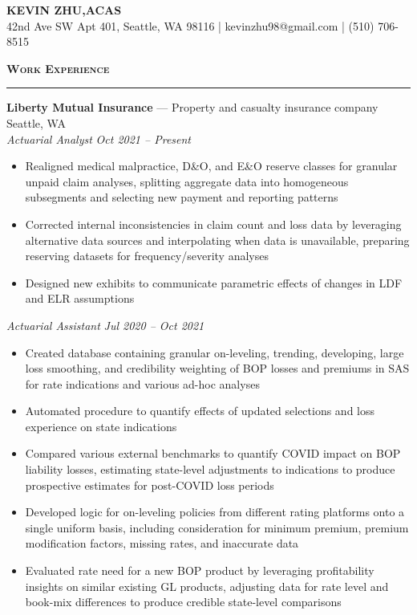 \documentclass[11pt,letterpaper]{article}
\newcommand{\sectline}{\vspace{5pt}\hrule height 1.5pt\vspace{5pt}}
\newcommand{\sectspace}{\vspace{9pt}}
\newcommand{\heading}[1]{{\fontsize{12pt}{13pt} {\textbf{\textsc{#1}}}}}
\begin{document}
\centering
{\fontsize{13pt}{13pt}\selectfont \textbf{KEVIN ZHU,\hspace{1.7 mm}ACAS}} \vspace{2pt} \\

{\fontsize{11pt}{13pt} 42nd Ave SW Apt 401, Seattle, WA 98116 | kevinzhu98@gmail.com | (510) 706-8515}
\sectspace

\fontsize{11pt}{13.75pt}\selectfont
\raggedright

\heading{Work Experience}\sectline
\textbf{Liberty Mutual Insurance} --- Property and casualty insurance company \hfill Seattle, WA \\
\textit{Actuarial Analyst} \hfill \textit{Oct 2021 -- Present} \\
\begin{itemize}
	\item Realigned medical malpractice, D\&O, and E\&O reserve classes for granular unpaid claim analyses, splitting aggregate data into homogeneous subsegments and selecting new payment and reporting patterns
	\item Corrected internal inconsistencies in claim count and loss data by leveraging alternative data sources and interpolating when data is unavailable, preparing reserving datasets for frequency/severity analyses
	\item Designed new exhibits to communicate parametric effects of changes in LDF and ELR assumptions
\end{itemize}
\textit{Actuarial Assistant} \hfill \textit{Jul 2020 -- Oct 2021}
\begin{itemize}
	\item Created database containing granular on-leveling, trending, developing, large loss smoothing, and credibility weighting of BOP losses and premiums in SAS for rate indications and various ad-hoc analyses
	\item Automated procedure to quantify effects of updated selections and loss experience on state indications
	\item Compared various external benchmarks to quantify COVID impact on BOP liability losses, estimating state-level adjustments to indications to produce prospective estimates for post-COVID loss periods
	\item Developed logic for on-leveling policies from different rating platforms onto a single uniform basis, including consideration for minimum premium, premium modification factors, missing rates, and inaccurate data
	\item Evaluated rate need for a new BOP product by leveraging profitability insights on similar existing GL products, adjusting data for rate level and book-mix differences to produce credible state-level comparisons
\end{itemize}
\end{document}
